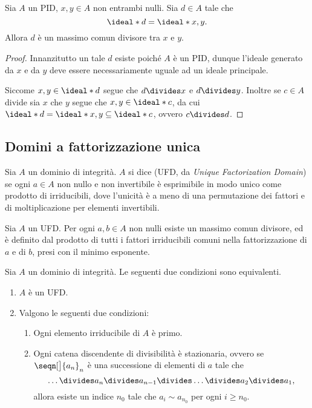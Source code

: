 \begin{proposition}
    Sia $A$ un PID, $x, y \in A$ non entrambi nulli. Sia $d \in A$ tale che \[
        \ideal*{d} = \ideal*{x, y}.    
    \] Allora $d$ è un massimo comun divisore tra $x$ e $y$.
\end{proposition}
\begin{proof}
    Innanzitutto un tale $d$ esiste poiché $A$ è un PID, dunque l'ideale generato da $x$ e da $y$ deve essere necessariamente uguale ad un ideale principale.

    Siccome $x, y \in \ideal*{d}$ segue che $d \divides x$ e $d \divides y$. Inoltre se $c \in A$ divide sia $x$ che $y$ segue che $x, y \in \ideal*{c}$, da cui $\ideal*{d} = \ideal*{x, y} \subseteq \ideal*{c}$, ovvero $c \divides d$.
\end{proof}

\subsection{Domini a fattorizzazione unica}

\begin{definition}
    Sia $A$ un dominio di integrità. $A$ si dice  (UFD, da \emph{Unique Factorization Domain}) se ogni $a \in A$ non nullo e non invertibile è esprimibile in modo unico come prodotto di irriducibili, dove l'unicità è a meno di una permutazione dei fattori e di moltiplicazione per elementi invertibili.
\end{definition}

\begin{proposition}
    Sia $A$ un UFD. Per ogni $a, b \in A$ non nulli esiste un massimo comun divisore, ed è definito dal prodotto di tutti i fattori irriducibili comuni nella fattorizzazione di $a$ e di $b$, presi con il minimo esponente.
\end{proposition}

\begin{theorem}
    \label{th:caratt_UFD}
    Sia $A$ un dominio di integrità. Le seguenti due condizioni sono equivalenti.
    \begin{enumerate}
        \item $A$ è un UFD.
        \item Valgono le seguenti due condizioni: \begin{enumerate}[label={(\roman*)}]
            \item Ogni elemento irriducibile di $A$ è primo.
            \item Ogni catena discendente di divisibilità è stazionaria, ovvero se $\seqn[\big]{a_n}_n$ è una successione di elementi di $a$ tale che \[
                \dots \divides a_n \divides a_{n-1} \divides \dots \divides a_2 \divides a_1,    
            \] allora esiste un indice $n_0$ tale che $a_i \sim a_{n_0}$ per ogni $i \geq n_0$.
        \end{enumerate}
    \end{enumerate}
\end{theorem}

